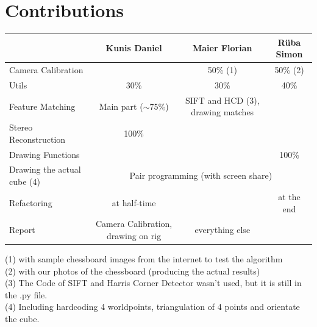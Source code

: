 \documentclass[paper=a4, fontsize=11pt]{scrartcl}
\numberwithin{equation}{section}		%
\numberwithin{figure}{section}			%
\numberwithin{table}{section}				%
\begin{document}
\section*{Contributions}
\begin{table}[!htbp]
\begin{tabular}{|l|ccc|}
\hline
{\color[HTML]{656565} }                        & {\color[HTML]{9B9B9B} Kunis Daniel}         & {\color[HTML]{9B9B9B} Maier Florian}                   & {\color[HTML]{9B9B9B} Rüba Simon} \\ \hline
{\color[HTML]{9B9B9B} Camera Calibration}      & \multicolumn{1}{c|}{}                       & \multicolumn{1}{c|}{50\% (1)}                          & 50\% (2)                          \\ \cline{2-4} 
{\color[HTML]{9B9B9B} Utils}                   & \multicolumn{1}{c|}{30\%}                   & \multicolumn{1}{c|}{30\%}                              & 40\%                              \\ \cline{2-4} 
{\color[HTML]{9B9B9B} Feature Matching}        & \multicolumn{1}{c|}{Main part ($\sim$75\%)} & \multicolumn{1}{c|}{SIFT and HCD (3), drawing matches} &                                   \\ \cline{2-4} 
{\color[HTML]{9B9B9B} Stereo Reconstruction}   & \multicolumn{1}{c|}{100\%}                  & \multicolumn{1}{c|}{}                                  &                                   \\ \cline{2-4} 
{\color[HTML]{9B9B9B} Drawing Functions}       & \multicolumn{1}{c|}{}                       & \multicolumn{1}{c|}{}                                  & 100\%                             \\ \cline{2-4} 
{\color[HTML]{9B9B9B} Drawing the actual cube (4)} & \multicolumn{3}{c|}{Pair programming (with screen share)}                                                                                \\ \cline{2-4} 
{\color[HTML]{9B9B9B} Refactoring}             & \multicolumn{1}{c|}{at half-time}           & \multicolumn{1}{c|}{}                                  & at the end                        \\ \cline{2-4} 
{\color[HTML]{9B9B9B} Report}                  & \multicolumn{1}{c|}{Camera Calibration, drawing on rig}     & \multicolumn{1}{c|}{everything else}                   &                                   \\ \hline
\end{tabular}
\end{table}\smallskip\noindent(1) with sample chessboard images from the internet to test the algorithm\\(2) with our photos of the chessboard (producing the actual results)\\(3) The Code of SIFT and Harris Corner Detector wasn't used, but it is still in the .py file.\\(4) Including hardcoding 4 worldpoints, triangulation of 4 points and orientate the cube.


\end{document}
